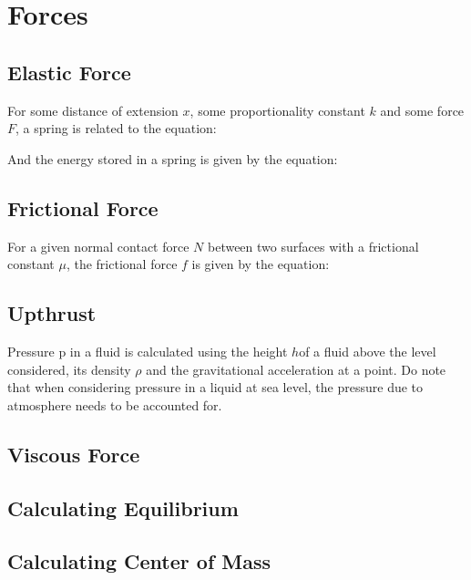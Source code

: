 \documentclass[../main]{subfiles}
\begin{document}
\section{Forces}

	\subsection{Elastic Force}


	For some distance of extension \(x\), some proportionality constant \(k\) and some force \(F\), a spring is related to the equation:


	And the energy stored in a spring is given by the equation:


	\subsection{Frictional Force}


	For a given normal contact force \(N\) between two surfaces with a frictional constant \(\mu\), the frictional force \(f\) is given by the equation:


	\subsection{Upthrust}




	Pressure p in a fluid is calculated using the height \(h\)of a fluid above the level considered, its density \(\rho\) and the gravitational acceleration at a point. Do note that when considering pressure in a liquid at sea level, the pressure due to atmosphere needs to be accounted for.


	\subsection{Viscous Force}

	\subsection{Calculating Equilibrium}

	\subsection{Calculating Center of Mass}
\end{document}

